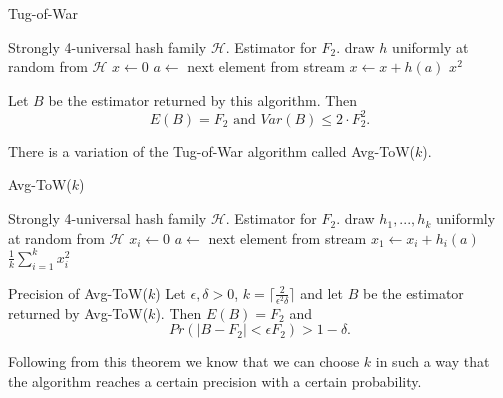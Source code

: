\documentclass[english]{panikzettel}
\begin{document}
\begin{halfboxl}
\vspace{-\baselineskip}
\begin{algo}{Tug-of-War}
{
\renewcommand{\algorithmicrequire}{\textbf{Input:}}     \renewcommand{\algorithmicensure}{\textbf{Output:}}
  \begin{algorithmic}[1]
  \Require Strongly 4-universal hash family $\mathcal{H}$.
  \Ensure Estimator for $F_2$.
  \State draw $h$ uniformly at random from $\mathcal{H}$
  \State $x\leftarrow 0$
    \State $a\leftarrow $ next element from stream
    \State $x\leftarrow x + h(a)$
  \EndWhile
  \State \Return $x^2$
\end{algorithmic}
}
\end{algo}
\end{halfboxl}
\begin{halfboxr}
\vspace{-\baselineskip}
Let $B$ be the estimator returned by this algorithm. Then
\[
E(B)=F_2 \text{ and } Var(B)\leq 2\cdot F_2^2.
\]
\end{halfboxr}

There is a variation of the Tug-of-War algorithm called Avg-ToW($k$).

\begin{halfboxl}
\vspace{-\baselineskip}
	\begin{algo}{Avg-ToW($k$)}
	{
	\renewcommand{\algorithmicrequire}{\textbf{Input:}}     \renewcommand{\algorithmicensure}{\textbf{Output:}}
  \begin{algorithmic}[1]
  \Require Strongly 4-universal hash family $\mathcal{H}$.
  \Ensure Estimator for $F_2$.
	  \State draw $h_1,...,h_k$ uniformly at random from $\mathcal{H}$
	    \State $x_i\leftarrow 0$
	  \EndFor
	    \State $a\leftarrow $ next element from stream
	      \State $x_1\leftarrow x_i + h_i(a)$
	    \EndFor
	  \EndWhile
	  \State \Return $\frac{1}{k}\sum_{i=1}^k x_i^2$
	\end{algorithmic}
	}
	\end{algo}
\end{halfboxl}
\begin{halfboxr}
\vspace{-\baselineskip}
\begin{theo}{Precision of Avg-ToW($k$)}
Let $\epsilon,\delta>0$, $k= \lceil \frac{2}{\epsilon^2\delta} \rceil$ and let $B$ be the estimator returned by Avg-ToW($k$). Then $E(B)=F_2$ and
\[
Pr(|B-F_2| < \epsilon F_2)>1-\delta.
\]
\end{theo}
Following from this theorem we know that we can choose $k$ in such a way that the algorithm reaches a certain precision with a certain probability.
\end{halfboxr}
\end{document}
